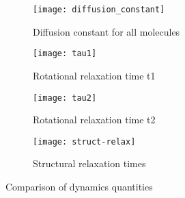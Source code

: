 \begin{figure}
    \begin{subfigure}{0.5\linewidth}
        \texttt{[image: diffusion\_constant]}
        \caption{Diffusion constant for all molecules}
        \label{diffusion constant}
    \end{subfigure}
    \begin{subfigure}{0.5\linewidth}
        \texttt{[image: tau1]}
        \caption{Rotational relaxation time t1}
        \label{tau1}
    \end{subfigure}
    \begin{subfigure}{0.5\textwidth}
        \texttt{[image: tau2]}
        \caption{Rotational relaxation time t2}
        \label{tau2}
    \end{subfigure}
    \begin{subfigure}{0.5\textwidth}
        \texttt{[image: struct-relax]}
        \caption{Structural relaxation times}
        \label{struct relax}
    \end{subfigure}
    \caption{Comparison of dynamics quantities}
    \label{dynamic comparison}
\end{figure}


